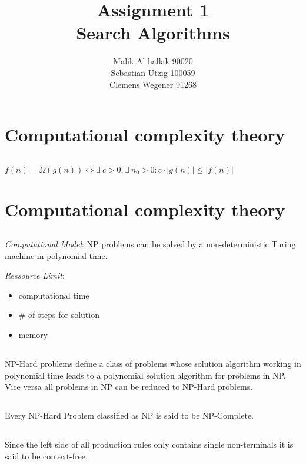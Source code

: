\documentclass[11pt]{article}
\title{\textbf{Assignment 1\\}Search Algorithms}
\author{Malik Al-hallak 90020\\
		Sebastian Utzig 100059\\
		Clemens Wegener 91268}
\date{}
\begin{document}
\maketitle
\section{Computational complexity theory}

\setcounter{subsection}{1} %
\subsection{}
$f(n) = \Omega{(g(n))} \Longleftrightarrow \exists\: c>0,\exists \: n_0>0:c\cdot |g(n)|\leq|f(n)|$

\section{Computational complexity theory}
\subsection{}
\emph{Computational Model}: NP problems can be solved by a non-deterministic Turing machine in polynomial time.

\bigskip

\emph{Ressource Limit}: \begin{itemize}[nosep]
							\item computational time
							\item \# of steps for solution
							\item memory 
						\end{itemize}

\subsection{}
NP-Hard problems define a class of problems whose solution algorithm working in polynomial time leads to a polynomial solution algorithm for problems in NP. Vice versa all problems in NP can be reduced to NP-Hard problems.

\subsection{}
Every NP-Hard Problem classified as NP is said to be NP-Complete.

\subsection{}
Since the left side of all production rules only contains single non-terminals it is said to be context-free.
\end{document}
